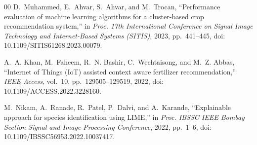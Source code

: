 \documentclass[conference]{IEEEtran}
\begin{document}
\begin{thebibliography}{00}
D.~Muhammed, E.~Ahvar, S.~Ahvar, and M.~Trocan,
``Performance evaluation of machine learning algorithms for a cluster-based crop recommendation system,''
in \textit{Proc. 17th International Conference on Signal Image Technology and Internet-Based Systems (SITIS)}, 2023, pp.~441--445,
doi: 10.1109/SITIS61268.2023.00079.

A.~A. Khan, M.~Faheem, R.~N. Bashir, C.~Wechtaisong, and M.~Z. Abbas,
``Internet of {T}hings ({IoT}) assisted context aware fertilizer recommendation,''
\textit{IEEE Access}, vol.~10, pp.~129505--129519, 2022,
doi: 10.1109/ACCESS.2022.3228160.

M.~Nikam, A.~Ranade, R.~Patel, P.~Dalvi, and A.~Karande,
``Explainable approach for species identification using {LIME},''
in \textit{Proc. IBSSC IEEE Bombay Section Signal and Image Processing Conference}, 2022, pp.~1--6,
doi: 10.1109/IBSSC56953.2022.10037417.

\end{thebibliography}
   
\end{document}
